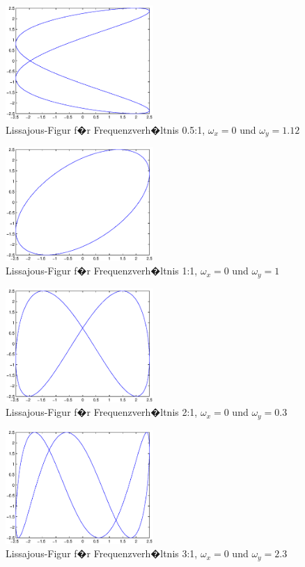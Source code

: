 \documentclass[10pt]{scrartcl}
\begin{document}
\begin{figure}
\includegraphics[width=0.5\textwidth]{05-1.eps}
\caption{Lissajous-Figur f�r Frequenzverh�ltnis 0.5:1, $\omega_x=0$ und $\omega_y=1.12$}
\label{fig:0.5:1}
\end{figure}

\begin{figure}
\includegraphics[width=0.5\textwidth]{1-1.eps}
\caption{Lissajous-Figur f�r Frequenzverh�ltnis 1:1, $\omega_x=0$ und $\omega_y=1$}
\label{fig:1:1}
\end{figure}

\begin{figure}
\includegraphics[width=0.5\textwidth]{2-1.eps}
\caption{Lissajous-Figur f�r Frequenzverh�ltnis 2:1, $\omega_x=0$ und $\omega_y=0.3$}
\label{fig:2:1}
\end{figure}

\begin{figure}
\includegraphics[width=0.5\textwidth]{3-1.eps}
\caption{Lissajous-Figur f�r Frequenzverh�ltnis 3:1, $\omega_x=0$ und $\omega_y=2.3$}
\label{fig:3:1}
\end{figure}
\end{document}
